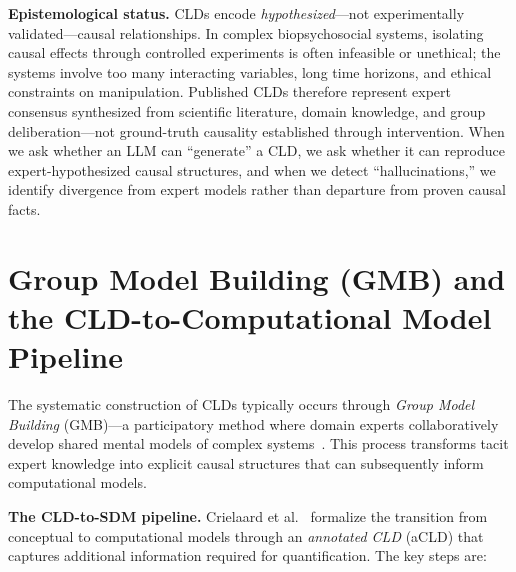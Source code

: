\medskip
\noindent
\textbf{Epistemological status.} CLDs encode \emph{hypothesized}---not experimentally validated---causal relationships. In complex biopsychosocial systems, isolating causal effects through controlled experiments is often infeasible or unethical; the systems involve too many interacting variables, long time horizons, and ethical constraints on manipulation. Published CLDs therefore represent expert consensus synthesized from scientific literature, domain knowledge, and group deliberation---not ground-truth causality established through intervention. When we ask whether an LLM can ``generate'' a CLD, we ask whether it can reproduce expert-hypothesized causal structures, and when we detect ``hallucinations,'' we identify divergence from expert models rather than departure from proven causal facts.

\section{Group Model Building (GMB) and the CLD-to-Computational Model Pipeline}
\label{sec:background_gmb}

The systematic construction of CLDs typically occurs through \emph{Group Model Building} (GMB)---a participatory method where domain experts collaboratively develop shared mental models of complex systems~\cite{crielaard2024refining}. This process transforms tacit expert knowledge into explicit causal structures that can subsequently inform computational models.

\medskip
\noindent
\textbf{The CLD-to-SDM pipeline.} Crielaard et al.~\cite{crielaard2024refining} formalize the transition from conceptual to computational models through an \emph{annotated CLD} (aCLD) that captures additional information required for quantification. The key steps are:

